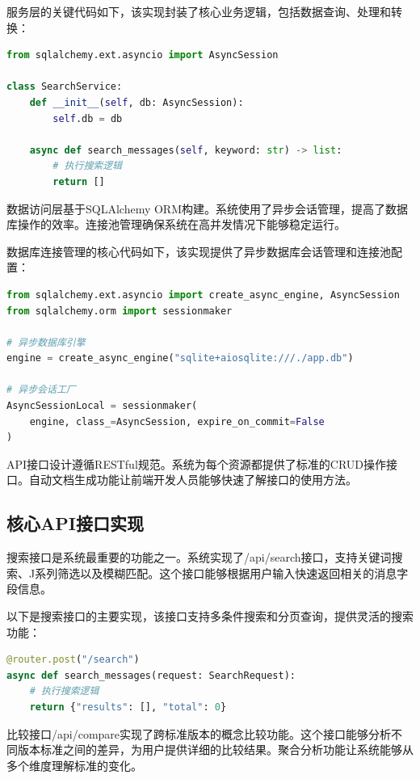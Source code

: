 服务层的关键代码如下，该实现封装了核心业务逻辑，包括数据查询、处理和转换：

\begin{lstlisting}[language=Python, label=fig:fastapi_service]
from sqlalchemy.ext.asyncio import AsyncSession

class SearchService:
    def __init__(self, db: AsyncSession):
        self.db = db
    
    async def search_messages(self, keyword: str) -> list:
        # 执行搜索逻辑
        return []
\end{lstlisting}

数据访问层基于SQLAlchemy ORM构建。系统使用了异步会话管理，提高了数据库操作的效率。连接池管理确保系统在高并发情况下能够稳定运行。

数据库连接管理的核心代码如下，该实现提供了异步数据库会话管理和连接池配置：

\begin{lstlisting}[language=Python, label=fig:fastapi_database]
from sqlalchemy.ext.asyncio import create_async_engine, AsyncSession
from sqlalchemy.orm import sessionmaker

# 异步数据库引擎
engine = create_async_engine("sqlite+aiosqlite:///./app.db")

# 异步会话工厂
AsyncSessionLocal = sessionmaker(
    engine, class_=AsyncSession, expire_on_commit=False
)
\end{lstlisting}

API接口设计遵循RESTful规范。系统为每个资源都提供了标准的CRUD操作接口。自动文档生成功能让前端开发人员能够快速了解接口的使用方法。



\subsection{核心API接口实现}

搜索接口是系统最重要的功能之一。系统实现了/api/search接口，支持关键词搜索、J系列筛选以及模糊匹配。这个接口能够根据用户输入快速返回相关的消息字段信息。

以下是搜索接口的主要实现，该接口支持多条件搜索和分页查询，提供灵活的搜索功能：

\begin{lstlisting}[language=Python, label=fig:search_api]
@router.post("/search")
async def search_messages(request: SearchRequest):
    # 执行搜索逻辑
    return {"results": [], "total": 0}
\end{lstlisting}

比较接口/api/compare实现了跨标准版本的概念比较功能。这个接口能够分析不同版本标准之间的差异，为用户提供详细的比较结果。聚合分析功能让系统能够从多个维度理解标准的变化。

